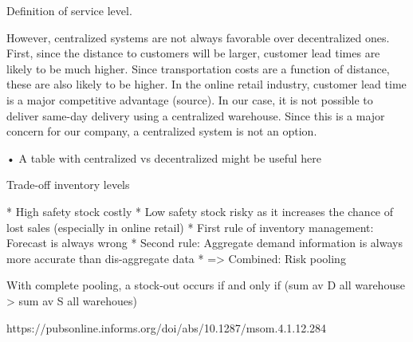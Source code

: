 \documentclass[../../main.tex]{subfiles}
\begin{document}
Definition of service level.

However, centralized systems are not always favorable over decentralized ones. First, since the distance to customers will be larger, customer lead times are likely to be much higher. Since transportation costs are a function of distance, these are also likely to be higher. In the online retail industry, customer lead time is a major competitive advantage (source). In our case, it is not possible to deliver same-day delivery using a centralized warehouse. Since this is a major concern for our company, a centralized system is not an option.

•	A table with centralized vs decentralized might be useful here

Trade-off inventory levels

*	High safety stock costly
*	Low safety stock risky as it increases the chance of lost sales (especially in online retail)
*	First rule of inventory management: Forecast is always wrong
*	Second rule: Aggregate demand information is always more accurate than dis-aggregate data
*	=> Combined: Risk pooling

With complete pooling, a stock-out occurs if and only if (sum av D all warehouse > sum av S all warehoues)

https://pubsonline.informs.org/doi/abs/10.1287/msom.4.1.12.284

\end{document}

